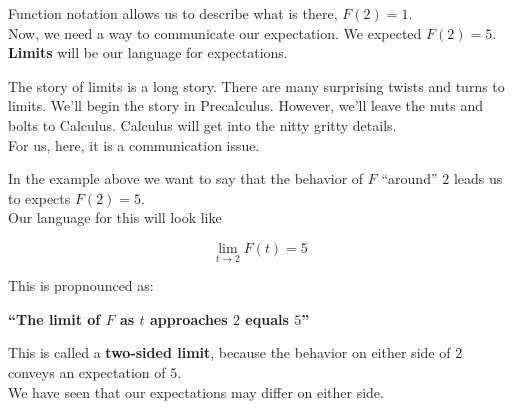 \documentclass{ximera}
\begin{document}
Function notation allows us to describe what is there, $F(2) = 1$. \\

Now, we need a way to communicate our expectation.  We expected $F(2) = 5$. \\






\textbf{\textcolor{purple!85!blue}{Limits}} will be our language for expectations. \\

\begin{warning}


The story of limits is a long story.  There are many surprising twists and turns to limits. We'll begin the story in Precalculus.  However, we'll leave the nuts and bolts to Calculus. Calculus will get into the nitty gritty details. \\

For us, here, it is a communication issue.
\end{warning}






\begin{idea}

In the example above we want to say that the behavior of $F$ ``around'' $2$ leads us to expects $F(2)=5$.\\

Our language for this will look like

\[   \lim\limits_{t \to 2} F(t) = 5\]


This is propnounced as: 


\begin{center}
\textbf{\textcolor{red!70!black}{``The limit of $F$ as $t$ approaches $2$ equals $5$''}}
\end{center}



\end{idea}






This is called a \textbf{\textcolor{purple!85!blue}{two-sided limit}}, because the behavior on either side of $2$ conveys an expectation of $5$. \\





We have seen that our expectations may differ on either side. \\
\end{document}

